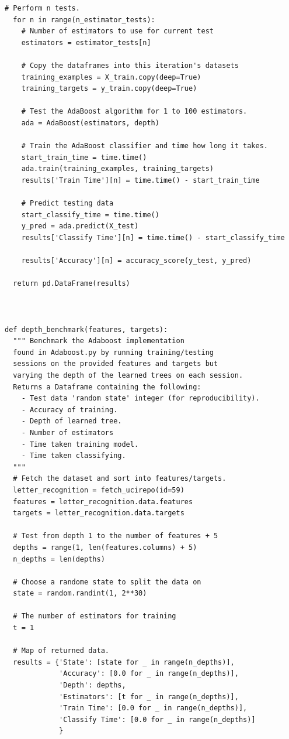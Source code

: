\documentclass[a4paper]{article}
\begin{document}
\begin{lstlisting}[basicstyle= \scriptsize]
  # Perform n tests.
  for n in range(n_estimator_tests):
    # Number of estimators to use for current test
    estimators = estimator_tests[n]

    # Copy the dataframes into this iteration's datasets
    training_examples = X_train.copy(deep=True)
    training_targets = y_train.copy(deep=True)

    # Test the AdaBoost algorithm for 1 to 100 estimators.
    ada = AdaBoost(estimators, depth) 

    # Train the AdaBoost classifier and time how long it takes.
    start_train_time = time.time()
    ada.train(training_examples, training_targets)
    results['Train Time'][n] = time.time() - start_train_time 

    # Predict testing data
    start_classify_time = time.time()
    y_pred = ada.predict(X_test)
    results['Classify Time'][n] = time.time() - start_classify_time

    results['Accuracy'][n] = accuracy_score(y_test, y_pred)

  return pd.DataFrame(results)



def depth_benchmark(features, targets):
  """ Benchmark the Adaboost implementation
  found in Adaboost.py by running training/testing
  sessions on the provided features and targets but
  varying the depth of the learned trees on each session.
  Returns a Dataframe containing the following:
    - Test data 'random state' integer (for reproducibility).
    - Accuracy of training.
    - Depth of learned tree.
    - Number of estimators
    - Time taken training model.
    - Time taken classifying.
  """
  # Fetch the dataset and sort into features/targets.
  letter_recognition = fetch_ucirepo(id=59) 
  features = letter_recognition.data.features
  targets = letter_recognition.data.targets

  # Test from depth 1 to the number of features + 5
  depths = range(1, len(features.columns) + 5)
  n_depths = len(depths)

  # Choose a randome state to split the data on
  state = random.randint(1, 2**30)

  # The number of estimators for training
  t = 1 

  # Map of returned data.
  results = {'State': [state for _ in range(n_depths)],
             'Accuracy': [0.0 for _ in range(n_depths)],
             'Depth': depths,
             'Estimators': [t for _ in range(n_depths)],
             'Train Time': [0.0 for _ in range(n_depths)],
             'Classify Time': [0.0 for _ in range(n_depths)]
             }
  

\end{lstlisting}
\end{document}
